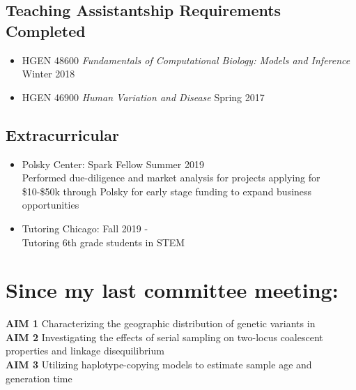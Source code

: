 \documentclass[a4paper, 11pt]{article}
\begin{document}
\subsection*{Teaching Assistantship Requirements Completed}
\begin{itemize}
	\item HGEN 48600 \emph{Fundamentals of Computational Biology: Models and Inference} \hfill Winter 2018\\
	\item HGEN 46900 \emph{Human Variation and Disease} \hfill Spring 2017\\
\end{itemize}

\subsection*{Extracurricular}
\begin{itemize}
	\item  Polsky Center: Spark Fellow \hfill Summer 2019 \\
		Performed due-diligence and market analysis for projects applying for \$10-\$50k through Polsky for early stage funding to expand business opportunities  
	\item  Tutoring Chicago:  \hfill Fall 2019 -  \\
		Tutoring 6th grade students in STEM 	
\end{itemize}

\newpage

\section*{Since my last committee meeting:}

 \textbf{AIM 1} Characterizing the geographic distribution of genetic variants in \\
	
 \textbf{AIM 2} Investigating the effects of serial sampling on two-locus coalescent properties and linkage disequilibrium\\
 
 \textbf{AIM 3} Utilizing haplotype-copying models to estimate sample age and generation time\\ 
 	


\end{document}

